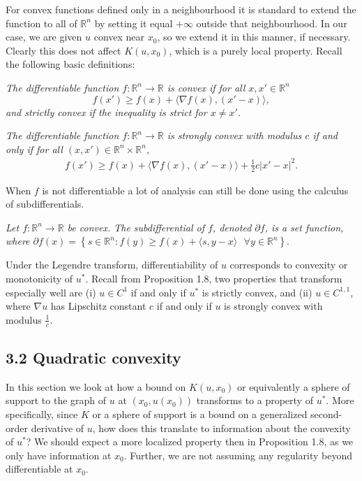 \documentclass[10pt]{article}
\newenvironment{definition}[2][Definition]{\begin{trivlist}
\item[\hskip \labelsep {\bfseries #1}\hskip \labelsep {\bfseries #2.}]}{\end{trivlist}}
\begin{document}
For convex functions defined only in a neighbourhood it is standard to extend the function to all of $\mathbb{R}^n$ by setting it equal $+\infty$ outside that neighbourhood. In our case, we are given $u$ convex near $x_0$, so we extend it in this manner, if necessary. Clearly this does not affect $K(u,x_0)$, which is a purely local property. 
Recall the following basic definitions:
\begin{definition}{3.1}
\textit{The differentiable function $f:\mathbb{R}^n\rightarrow \mathbb{R}$ is convex if for all $x,x'\in \mathbb{R}^n$ $$f(x')\geq f(x)+ \langle \nabla f(x),(x'-x) \rangle,$$ and strictly convex if the inequality is strict for $x\neq x'$.}
\end{definition}
\begin{definition}{3.2}
\textit{The differentiable function $f:\mathbb{R}^n\rightarrow\mathbb{R}$ is strongly convex with modulus $c$ if and only if for all $(x,x')\in \mathbb{R}^n \times \mathbb{R}^n$,} 
\begin{align*}
f(x')\geq f(x)+ \langle\nabla f(x), (x' - x)\rangle +\frac{1}{2} c |x' - x|^2.
\end{align*}
\end{definition}
When $f$ is not differentiable a lot of analysis can still be done using the calculus of subdifferentials.
\begin{definition}{3.3}
\textit{Let $f:\mathbb{R}^n\rightarrow\mathbb{R}$ be convex. The subdifferential of $f$, denoted $\partial f$, is a set function, where $\partial f(x)= \left\{ s\in \mathbb{R}^n: f(y)\geq f(x)+\langle s,y-x\rangle \text{  }  \forall y\in \mathbb{R}^n \right\}.$}
\end{definition}
Under the Legendre transform, differentiability of $u$ corresponds to convexity or monotonicity of $u^*$. Recall from Proposition 1.8, two properties that transform especially well are (i) $u\in C^1$ if and only if $u^*$ is strictly convex, and (ii) $u\in C^{1,1}$, where $\nabla u$ has Lipschitz constant $c$ if and only if $u$ is strongly convex with modulus $\frac{1}{c}$. 

\subsection{3.2 Quadratic convexity}
In this section we look at how a bound on $K(u,x_0)$ or equivalently a sphere of support to the graph of $u$ at $(x_0,u(x_0))$ transforms to a property of $u^*$. More specifically, since $K$ or a sphere of support is a bound on a generalized second-order derivative of $u$, how does this translate to information about the convexity of $u^*$? We should expect a more localized property then in Proposition 1.8, as we only have information at $x_0$. Further, we are not assuming any regularity beyond differentiable at $x_0$.
\end{document}
